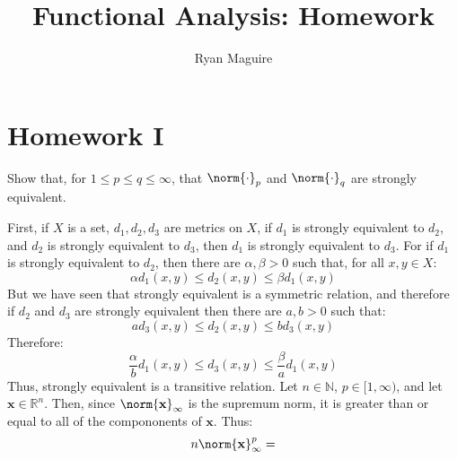 \documentclass[crop=false,class=article,oneside]{standalone}
\begin{document}
    \title{Functional Analysis: Homework}
    \author{Ryan Maguire}
    \date{\vspace{-5ex}}
    \maketitle
    \tableofcontents
    \clearpage
    \section{Homework I}
        \begin{problem}
            Show that, for $1\leq{p}\leq{q}\leq\infty$, that
            $\norm{\cdot}_{p}$ and $\norm{\cdot}_{q}$ are strongly
            equivalent.
        \end{problem}
        \begin{solution}[1]
            First, if $X$ is a set, $d_{1},d_{2},d_{3}$ are
            metrics on $X$, if $d_{1}$ is strongly equivalent to
            $d_{2}$, and $d_{2}$ is strongly equivalent to $d_{3}$,
            then $d_{1}$ is strongly equivalent to $d_{3}$.
            For if $d_{1}$ is strongly equivalent to $d_{2}$, then
            there are $\alpha,\beta>0$ such that, for all
            $x,y\in{X}$:
            \begin{equation}
                \alpha{d}_{1}(x,y)\leq{d}_{2}(x,y)
                \leq\beta{d}_{1}(x,y)
            \end{equation}
            But we have seen that strongly equivalent is a symmetric
            relation, and therefore if $d_{2}$ and $d_{3}$ are
            strongly equivalent then there are $a,b>0$ such that:
            \begin{equation}
                ad_{3}(x,y)\leq{d}_{2}(x,y)\leq{b}d_{3}(x,y)
            \end{equation}
            Therefore:
            \begin{equation}
                \frac{\alpha}{b}d_{1}(x,y)\leq{d}_{3}(x,y)
                \leq\frac{\beta}{a}d_{1}(x,y)
            \end{equation}
            Thus, strongly equivalent is a transitive relation.
            Let $n\in\mathbb{N}$, $p\in[1,\infty)$, and let
            $\mathbf{x}\in\mathbb{R}^{n}$. Then, since
            $\norm{\mathbf{x}}_{\infty}$ is the supremum norm,
            it is greater than or equal to all of the compononents
            of $\mathbf{x}$. Thus:
            \begin{equation}
                n\norm{\mathbf{x}}_{\infty}^{p}=

\end{equation}
\end{solution}
\end{document}
